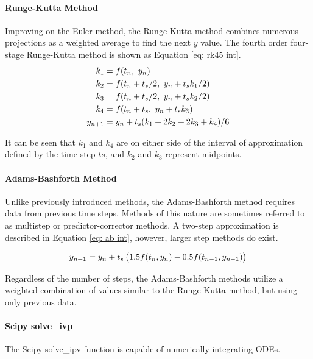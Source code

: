 \documentclass[12pt]{article}
\begin{document}
\paragraph{Runge-Kutta Method}
Improving on the Euler method, the Runge-Kutta method combines numerous projections as a weighted average to find the next $y$ value.
The fourth order four-stage Runge-Kutta method is shown as Equation \ref{eq: rk45 int}. 
\begin{equation}{\label{eq: rk45 int} }
\begin{aligned}
    k_1 &= f(t_n, \ y_n)\\
    k_2 &= f(t_n+t_s/2, \ y_n+t_s k_1/2)\\
    k_3 &= f(t_n+t_s/2, \ y_n+t_s k_2/2)\\
    k_4 &= f(t_n+t_s, \ y_n+t_sk_3)\\
    y_{n+1} &= y_n + t_s(k_1+2k_2+2k_3+k_4)/6
    \end{aligned}
\end{equation}%

\noindent It can be seen that $k_1$ and $k_4$ are on either side of the interval of approximation defined by the time step $ts$, and $k_2$ and $k_3$ represent midpoints.

\paragraph{Adams-Bashforth Method}
Unlike previously introduced methods, the Adams-Bashforth method requires data from previous time steps.
Methods of this nature are sometimes referred to as multistep or predictor-corrector methods.
A two-step approximation is described in Equation \ref{eq: ab int}, however, larger step methods do exist.

\begin{equation}{\label{eq: ab int} }
y_{n+1} = y_n + t_s \left( 1.5 f(t_n, y_n) - 0.5 f(t_{n-1}, y_{n-1}) \right)
\end{equation}%

\noindent Regardless of the number of steps,  the Adams-Bashforth methods utilize a  weighted combination of values similar to the Runge-Kutta method, but using only previous data.



\paragraph{Scipy solve\_ivp}
The Scipy solve\_ipv function is capable of numerically integrating ODEs.
\end{document}

